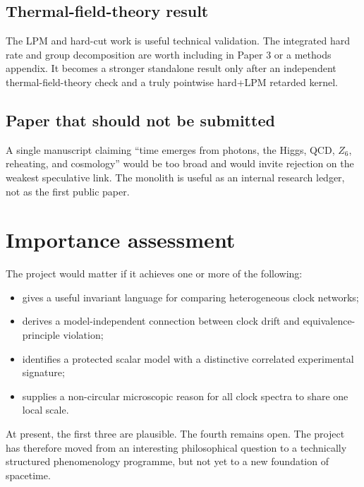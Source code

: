 \documentclass[
  10pt,
]{article}
\providecommand{\tightlist}{%
  \setlength{\itemsep}{0pt}\setlength{\parskip}{0pt}}
\begin{document}
\subsection{Thermal-field-theory
result}\label{thermal-field-theory-result}

The LPM and hard-cut work is useful technical validation. The integrated
hard rate and group decomposition are worth including in Paper 3 or a
methods appendix. It becomes a stronger standalone result only after an
independent thermal-field-theory check and a truly pointwise hard+LPM
retarded kernel.

\subsection{Paper that should not be
submitted}\label{paper-that-should-not-be-submitted}

A single manuscript claiming ``time emerges from photons, the Higgs,
QCD, \(Z_6\), reheating, and cosmology'' would be too broad and would
invite rejection on the weakest speculative link. The monolith is useful
as an internal research ledger, not as the first public paper.

\section{Importance assessment}\label{importance-assessment}

The project would matter if it achieves one or more of the following:

\begin{itemize}
\tightlist
\item
  gives a useful invariant language for comparing heterogeneous clock
  networks;
\item
  derives a model-independent connection between clock drift and
  equivalence-principle violation;
\item
  identifies a protected scalar model with a distinctive correlated
  experimental signature;
\item
  supplies a non-circular microscopic reason for all clock spectra to
  share one local scale.
\end{itemize}

At present, the first three are plausible. The fourth remains open. The
project has therefore moved from an interesting philosophical question
to a technically structured phenomenology programme, but not yet to a
new foundation of spacetime.
\end{document}
